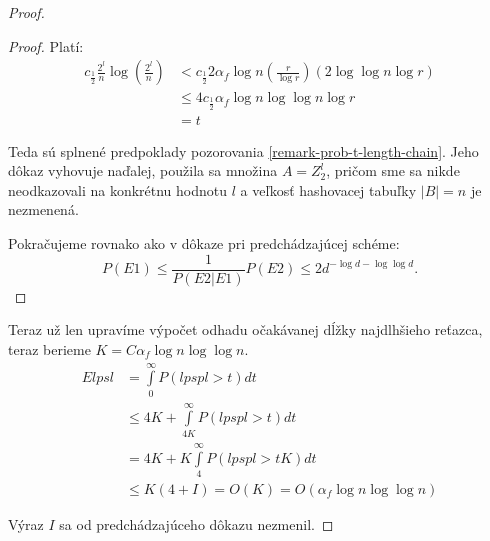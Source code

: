 \begin{proof}
\begin{proof}
Platí:
\begin{displaymath}
\begin{split}
c_{\frac{1}{2}} \frac{2^l}{n} \log \left(\frac{2^l}{n}\right) 
	& < c_{\frac{1}{2}} 2 \alpha_f \log n \left( \frac{r}{\log r} \right) \left(2 \log \log n \log r \right) \\
	& \leq 4 c_{\frac{1}{2}} \alpha_f \log n \log \log n \log r \\
	& = t
\end{split}
\end{displaymath}

Teda sú splnené predpoklady pozorovania \ref{remark-prob-t-length-chain}. Jeho dôkaz vyhovuje naďalej, použila sa množina $A = Z_2^l$, pričom sme sa nikde neodkazovali na konkrétnu hodnotu $l$ a veľkosť hashovacej tabuľky $|B| = n$ je nezmenená.

Pokračujeme rovnako ako v dôkaze pri predchádzajúcej schéme:
\begin{displaymath}
P(E1) \leq \frac{1}{P(E2|E1)}P(E2) \leq 2 d ^ {-\log d - \log \log d}\textit{.}
\end{displaymath}
\end{proof}

Teraz už len upravíme výpočet odhadu očakávanej dĺžky najdlhšieho reťazca, teraz berieme $K = C \alpha_f \log n \log \log n$.
\begin{displaymath}
\begin{split}
E lpsl 
	& = \int\limits_0^\infty P(lpspl > t) dt \\
	& \leq 4K + \int\limits_{4K}^\infty P(lpspl > t) dt \\
	& = 4K + K\int\limits_4^\infty P(lpspl > tK) dt \\
	& \leq K(4 + I) = O(K) = O(\alpha_f \log n \log \log n)
\end{split}
\end{displaymath}

Výraz $I$ sa od predchádzajúceho dôkazu nezmenil.
\end{proof}